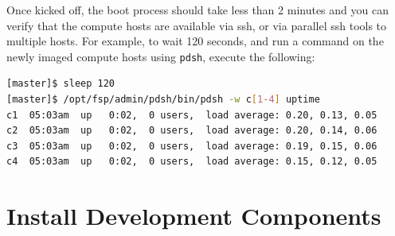 \documentclass[letterpaper]{article}
\begin{document}



Once kicked off, the boot process should take less than 2 minutes and you can
verify that the compute hosts are available via ssh, or via parallel ssh tools to multiple
hosts. For example, to wait 120 seconds, and run a command on the newly imaged
compute hosts using \texttt{pdsh}, execute the following:

\begin{lstlisting}[language=bash]
[master]$ sleep 120
[master]$ /opt/fsp/admin/pdsh/bin/pdsh -w c[1-4] uptime
c1  05:03am  up   0:02,  0 users,  load average: 0.20, 0.13, 0.05
c2  05:03am  up   0:02,  0 users,  load average: 0.20, 0.14, 0.06
c3  05:03am  up   0:02,  0 users,  load average: 0.19, 0.15, 0.06
c4  05:03am  up   0:02,  0 users,  load average: 0.15, 0.12, 0.05
\end{lstlisting}



\section{Install \FSP{} Development Components}
\end{document}
